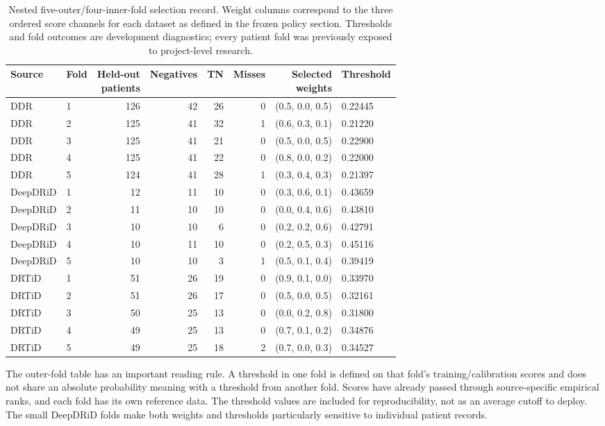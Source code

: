 \documentclass{ieeeaccess}
\begin{document}
\begin{table}[t]
\centering
\caption{Nested five-outer/four-inner-fold selection record. Weight columns correspond to the three ordered score channels for each dataset as defined in the frozen policy section. Thresholds and fold outcomes are development diagnostics; every patient fold was previously exposed to project-level research.}
\label{tab:nestedfold}
\footnotesize
\setlength{\tabcolsep}{3pt}
\begin{tabular}{llrrrrrl}
\toprule
Source & Fold & \shortstack{Held-out\\patients} & Negatives & TN & Misses & \shortstack{Selected\\weights} & Threshold \\
\midrule
DDR & 1 & 126 & 42 & 26 & 0 & (0.5, 0.0, 0.5) & 0.22445 \\
DDR & 2 & 125 & 41 & 32 & 1 & (0.6, 0.3, 0.1) & 0.21220 \\
DDR & 3 & 125 & 41 & 21 & 0 & (0.5, 0.0, 0.5) & 0.22900 \\
DDR & 4 & 125 & 41 & 22 & 0 & (0.8, 0.0, 0.2) & 0.22000 \\
DDR & 5 & 124 & 41 & 28 & 1 & (0.3, 0.4, 0.3) & 0.21397 \\
DeepDRiD & 1 & 12 & 11 & 10 & 0 & (0.3, 0.6, 0.1) & 0.43659 \\
DeepDRiD & 2 & 11 & 10 & 10 & 0 & (0.0, 0.4, 0.6) & 0.43810 \\
DeepDRiD & 3 & 10 & 10 & 6 & 0 & (0.2, 0.2, 0.6) & 0.42791 \\
DeepDRiD & 4 & 10 & 11 & 10 & 0 & (0.2, 0.5, 0.3) & 0.45116 \\
DeepDRiD & 5 & 10 & 10 & 3 & 1 & (0.5, 0.1, 0.4) & 0.39419 \\
DRTiD & 1 & 51 & 26 & 19 & 0 & (0.9, 0.1, 0.0) & 0.33970 \\
DRTiD & 2 & 51 & 26 & 17 & 0 & (0.5, 0.0, 0.5) & 0.32161 \\
DRTiD & 3 & 50 & 25 & 13 & 0 & (0.0, 0.2, 0.8) & 0.31800 \\
DRTiD & 4 & 49 & 25 & 13 & 0 & (0.7, 0.1, 0.2) & 0.34876 \\
DRTiD & 5 & 49 & 25 & 18 & 2 & (0.7, 0.0, 0.3) & 0.34527 \\
\bottomrule
\end{tabular}
\end{table}

The outer-fold table has an important reading rule. A threshold in one fold is defined on that fold's training/calibration scores and does not share an absolute probability meaning with a threshold from another fold. Scores have already passed through source-specific empirical ranks, and each fold has its own reference data. The threshold values are included for reproducibility, not as an average cutoff to deploy. The small DeepDRiD folds make both weights and thresholds particularly sensitive to individual patient records.
\end{document}
